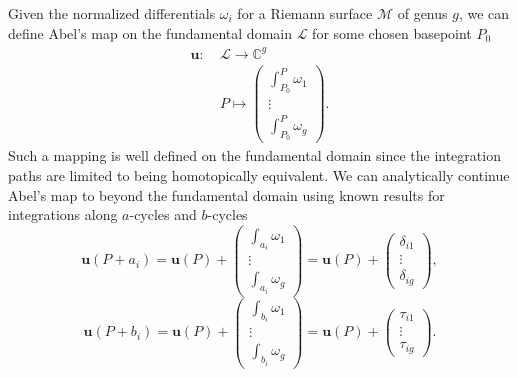 \begin{definition}\label{defB12:AbelMap}
    Given the normalized differentials $\omega_i$ for a Riemann surface $\mathcal M$ of genus $g$, we can define Abel's map on the fundamental domain $\mathcal L$ for some chosen basepoint $P_0$
    \begin{align}
        \mathbf{u} : & \ \mathcal L \rightarrow \mathbb C^g \\ & \ P \mapsto \begin{pmatrix}\int_{P_0}^P \omega_1 \\ \vdots \\ \int_{P_0}^P \omega_g \end{pmatrix}.
    \end{align}
    Such a mapping is well defined on the fundamental domain since the integration paths are limited to being homotopically equivalent. We can analytically continue Abel's map to beyond the fundamental domain using known results for integrations along $a$-cycles and $b$-cycles
    \begin{equation}
        \mathbf{u}(P+a_i) = \mathbf{u}(P) + \begin{pmatrix}\int_{a_i} \omega_1 \\ \vdots \\ \int_{a_i} \omega_g \end{pmatrix} = \mathbf{u}(P) + \begin{pmatrix} \delta_{i1} \\ \vdots \\ \delta_{ig} \end{pmatrix},
    \end{equation}
    \begin{equation}
        \mathbf{u}(P+b_i) = \mathbf{u}(P) + \begin{pmatrix}\int_{b_i} \omega_1 \\ \vdots \\ \int_{b_i} \omega_g \end{pmatrix} = \mathbf{u}(P) + \begin{pmatrix} \tau_{i1} \\ \vdots \\ \tau_{ig} \end{pmatrix}.
    \end{equation}
\end{definition}

